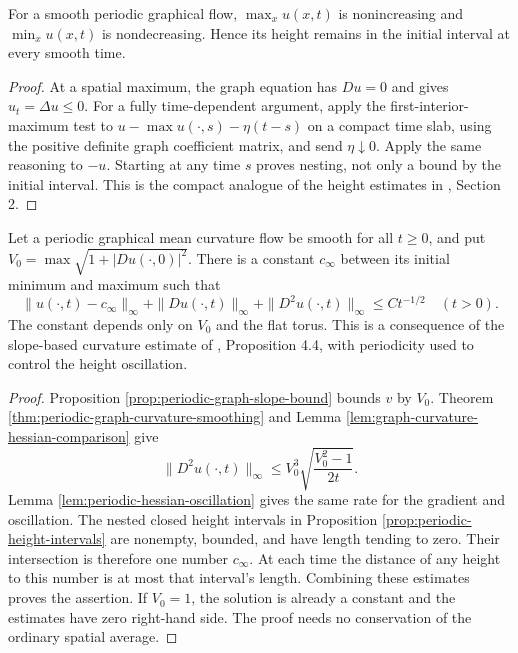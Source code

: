 \begin{proposition}\label{prop:periodic-height-intervals}
For a smooth periodic graphical flow, $\max_xu(x,t)$ is nonincreasing and $\min_xu(x,t)$ is nondecreasing. Hence its height remains in the initial interval at every smooth time.
\end{proposition}
\begin{proof}
At a spatial maximum, the graph equation has $Du=0$ and gives $u_t=\Delta u\leq0$. For a fully time-dependent argument, apply the first-interior-maximum test to $u-\max u(\cdot,s)-\eta(t-s)$ on a compact time slab, using the positive definite graph coefficient matrix, and send $\eta\downarrow0$. Apply the same reasoning to $-u$. Starting at any time $s$ proves nesting, not only a bound by the initial interval. This is the compact analogue of the height estimates in \cite{EH89}, Section 2.
\end{proof}

\begin{theorem}\label{thm:periodic-graph-conditional-convergence}
Let a periodic graphical mean curvature flow be smooth for all $t\geq0$, and put $V_0=\max\sqrt{1+|Du(\cdot,0)|^2}$. There is a constant $c_\infty$ between its initial minimum and maximum such that
\[
 \|u(\cdot,t)-c_\infty\|_\infty+
 \|Du(\cdot,t)\|_\infty+\|D^2u(\cdot,t)\|_\infty
 \leq C t^{-1/2}\quad(t>0).
\]
The constant depends only on $V_0$ and the flat torus. This is a consequence of the slope-based curvature estimate of \cite{EH89}, Proposition 4.4, with periodicity used to control the height oscillation.
\end{theorem}
\begin{proof}
Proposition \ref{prop:periodic-graph-slope-bound} bounds $v$ by $V_0$. Theorem \ref{thm:periodic-graph-curvature-smoothing} and Lemma \ref{lem:graph-curvature-hessian-comparison} give
\[
 \|D^2u(\cdot,t)\|_\infty
 \leq V_0^3\sqrt{\frac{V_0^2-1}{2t}}.
\]
Lemma \ref{lem:periodic-hessian-oscillation} gives the same rate for the gradient and oscillation. The nested closed height intervals in Proposition \ref{prop:periodic-height-intervals} are nonempty, bounded, and have length tending to zero. Their intersection is therefore one number $c_\infty$. At each time the distance of any height to this number is at most that interval's length. Combining these estimates proves the assertion. If $V_0=1$, the solution is already a constant and the estimates have zero right-hand side. The proof needs no conservation of the ordinary spatial average.
\end{proof}

